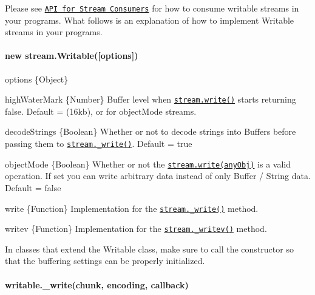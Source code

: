 Please see \href{#stream_api_for_stream_consumers}{\tt A\+PI for Stream Consumers} for how to consume writable streams in your programs. What follows is an explanation of how to implement Writable streams in your programs.

\paragraph*{new stream.\+Writable(\mbox{[}options\mbox{]})}


\begin{DoxyItemize}
\item {\ttfamily options} \{Object\}
\begin{DoxyItemize}
\item {\ttfamily high\+Water\+Mark} \{Number\} Buffer level when \href{#stream_writable_write_chunk_encoding_callback}{\tt {\ttfamily stream.\+write()}} starts returning {\ttfamily false}. Default = {} (16kb), or {} for {\ttfamily object\+Mode} streams.
\item {\ttfamily decode\+Strings} \{Boolean\} Whether or not to decode strings into Buffers before passing them to \href{#stream_writable_write_chunk_encoding_callback_1}{\tt {\ttfamily stream.\+\_\+write()}}. Default = {\ttfamily true}
\item {\ttfamily object\+Mode} \{Boolean\} Whether or not the \href{#stream_writable_write_chunk_encoding_callback}{\tt {\ttfamily stream.\+write(any\+Obj)}} is a valid operation. If set you can write arbitrary data instead of only {\ttfamily Buffer} / {\ttfamily String} data. Default = {\ttfamily false}
\item {\ttfamily write} \{Function\} Implementation for the \href{#stream_writable_write_chunk_encoding_callback_1}{\tt {\ttfamily stream.\+\_\+write()}} method.
\item {\ttfamily writev} \{Function\} Implementation for the \href{#stream_writable_writev_chunks_callback}{\tt {\ttfamily stream.\+\_\+writev()}} method.
\end{DoxyItemize}
\end{DoxyItemize}

In classes that extend the Writable class, make sure to call the constructor so that the buffering settings can be properly initialized.

\paragraph*{writable.\+\_\+write(chunk, encoding, callback)}


